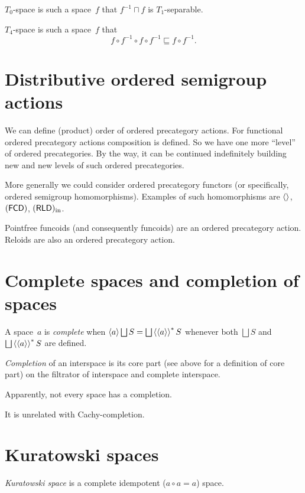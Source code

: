$T_0$-space is such a space~$f$ that $f^{-1}\sqcap f$ is $T_1$-separable.

$T_4$-space is such a space~$f$ that \[ f\circ f^{-1}\circ f\circ f^{-1}\sqsubseteq f\circ f^{-1}. \]

\chapter{Distributive ordered semigroup actions}

We can define (product) order of ordered precategory actions. For functional ordered precategory actions composition is defined. So we have one more ``level'' of ordered precategories. By the way, it can be continued indefinitely building new and new levels of such ordered precategories.

More generally we could consider ordered precategory functors (or specifically, ordered semigroup homomorphisms). Examples of such homomorphisms are $\left\langle \right\rangle$, $(\mathsf{FCD})$, $(\mathsf{RLD})_{\mathrm{in}}$.

Pointfree funcoids (and consequently funcoids) are an ordered precategory action. Reloids are also an ordered precategory action.

\chapter{Complete spaces and completion of spaces}

A space~$a$ is \emph{complete} when $\supfun{a}\bigsqcup S=\bigsqcup\rsupfun{\supfun{a}}S$ whenever both $\bigsqcup S$ and $\bigsqcup\rsupfun{\supfun{a}}S$ are defined.

\begin{defn}
\emph{Completion} of an interspace is its core part (see above for a definition of core part) on the filtrator of interspace and complete interspace.
\end{defn}

\begin{note}
Apparently, not every space has a completion.
\end{note}

\begin{note}
It is unrelated with Cachy-completion.
\end{note}

\chapter{Kuratowski spaces}

\begin{defn}
\emph{Kuratowski space} is a complete idempotent ($a\circ a=a$) space.
\end{defn}

